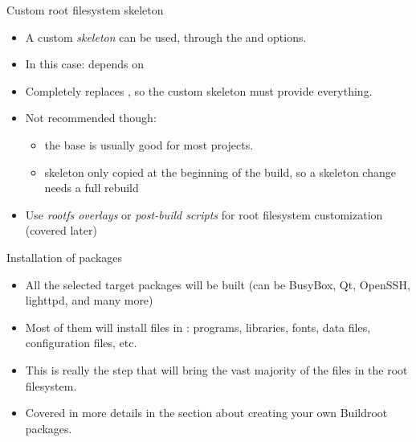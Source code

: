 \begin{frame}{Custom root filesystem skeleton}
  \begin{itemize}
  \item A custom {\em skeleton} can be used, through the
     and
     options.
  \item In this case:  depends on
  \item Completely replaces , so the custom
    skeleton must provide everything.
  \item Not recommended though:
    \begin{itemize}
    \item the base is usually good for most projects.
    \item skeleton only copied at the beginning of the build, so a
      skeleton change needs a full rebuild
    \end{itemize}
  \item Use {\em rootfs overlays} or {\em post-build scripts} for
    root filesystem customization (covered later)
  \end{itemize}
\end{frame}

\begin{frame}{Installation of packages}
  \begin{itemize}
  \item All the selected target packages will be built (can be
    BusyBox, Qt, OpenSSH, lighttpd, and many more)
  \item Most of them will install files in :
    programs, libraries, fonts, data files, configuration files, etc.
  \item This is really the step that will bring the vast majority of
    the files in the root filesystem.
  \item Covered in more details in the section about creating your own
    Buildroot packages.
  \end{itemize}
\end{frame}

